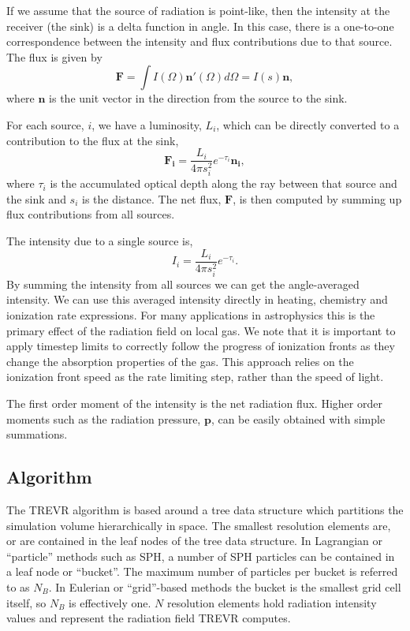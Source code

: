 \documentclass[fleq,usenatbib]{mnras}
\newcommand{\acro}{TREVR}
\begin{document}
{If we assume that the source of radiation is point-like, then the intensity at 
the receiver (the sink) is a delta function in angle. In this case, there is a 
one-to-one correspondence between the intensity and flux contributions due to 
that source. The flux is given by 
\begin{equation}
  \mathbf{F} = \int I(\Omega) \mathbf{n'}(\Omega) d\Omega = I(s) \mathbf{n},
\end{equation}
where $\mathbf{n}$ is the unit vector in the direction from the source to the 
sink.

For each source, $i$, we have a luminosity, $L_i$, which can be directly 
converted to a contribution to the flux at the sink,
\begin{equation}
\label{eqn:simpflux}
\mathbf{F_i} = \frac{L_i}{4\pi s_i^2} e^{-\tau_i} \mathbf{n_i},
\end{equation}
where $\tau_i$ is the accumulated optical depth along the ray between that 
source and the sink and $s_i$ is the distance. The net flux, $\mathbf{F}$, is 
then computed by summing up flux contributions from all sources.

The intensity due to a single source is,
\begin{equation}
\label{eqn:simpint}
I_i = \frac{L_i}{4\pi s_i^2} e^{-\tau_i}.
\end{equation}
By summing the intensity from all sources we can get the angle-averaged 
intensity. We can use this averaged intensity directly in heating, chemistry 
and ionization rate expressions. For many applications in astrophysics this is 
the primary effect of the radiation field on local gas. We note that it is important
to apply timestep limits to correctly follow the progress of ionization fronts as they change
the absorption properties of the gas.  This approach
relies on the ionization front speed as the rate limiting step, rather than the speed of light.

The first order moment of the intensity is the net radiation flux.  Higher 
order moments such as the radiation pressure, $\mathbf{p}$, can be easily 
obtained with simple summations.

\subsection{Algorithm}\label{sec:algo}
The \acro{} algorithm is based around a tree data structure which partitions 
the simulation volume hierarchically in space. The smallest resolution 
elements are, or are contained in the leaf nodes of the tree data 
structure. In Lagrangian or ``particle'' methods such as SPH, a number of SPH 
particles can be contained in a leaf node or ``bucket''. The maximum number of 
particles per bucket is referred to as $N_B$. In Eulerian or ``grid''-based 
methods the bucket is the smallest grid cell itself, so $N_B$ is effectively 
one. $N$ resolution elements hold radiation intensity values and represent the 
radiation field \acro{} computes. 

}
\end{document}
